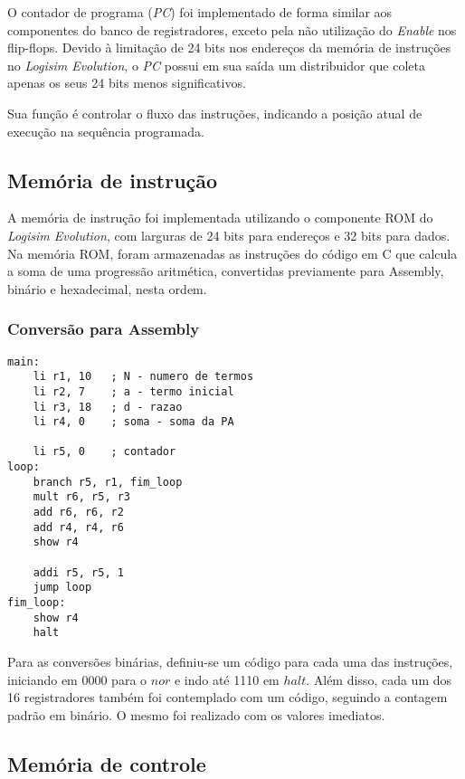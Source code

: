 \documentclass[twocolumn, 11pt]{article}
\begin{document}
O contador de programa (\textit{PC}) foi implementado de forma similar aos componentes do banco de registradores, exceto pela não utilização do \textit{Enable} nos flip-flops. Devido à limitação de 24 bits nos endereços da memória de instruções no \textit{Logisim Evolution}, o \textit{PC} possui em sua saída um distribuidor que coleta apenas os seus 24 bits menos significativos.

Sua função é controlar o fluxo das instruções, indicando a posição atual de execução na sequência programada.

\subsection{Memória de instrução}

A memória de instrução foi implementada utilizando o componente ROM do \textit{Logisim Evolution}, com larguras de 24 bits para endereços e 32 bits para dados. Na memória ROM, foram armazenadas as instruções do código em C que calcula a soma de uma progressão aritmética, convertidas previamente para Assembly, binário e hexadecimal, nesta ordem.

\subsubsection{Conversão para Assembly}

\begin{lstlisting}
main:
    li r1, 10   ; N - numero de termos
    li r2, 7    ; a - termo inicial
    li r3, 18   ; d - razao
    li r4, 0    ; soma - soma da PA 

    li r5, 0    ; contador
loop:
    branch r5, r1, fim_loop
    mult r6, r5, r3
    add r6, r6, r2
    add r4, r4, r6
    show r4

    addi r5, r5, 1	
    jump loop 	
fim_loop:
    show r4 
    halt
\end{lstlisting}

Para as conversões binárias, definiu-se um código para cada uma das instruções, iniciando em 0000 para o $nor$ e indo até 1110 em $halt$. Além disso, cada um dos 16 registradores também foi contemplado com um código, seguindo a contagem padrão em binário. O mesmo foi realizado com os valores imediatos. 

\subsection{Memória de controle}
\end{document}
